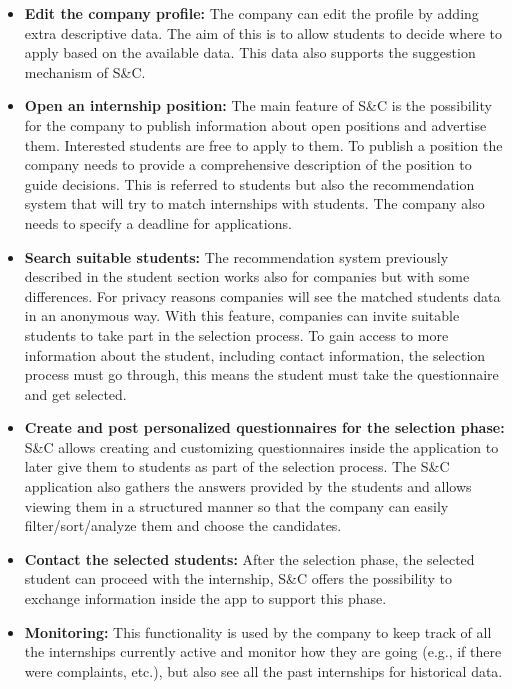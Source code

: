 \begin{itemize}
    \item \textbf{Edit the company profile:} The company can edit the profile by adding extra descriptive data. The aim of this is to allow students to decide where to apply based on the available data. This data also supports the suggestion mechanism of S\&C.
    
    \item \textbf{Open an internship position:} The main feature of S\&C is the possibility for the company to publish information about open positions and advertise them. Interested students are free to apply to them. To publish a position the company needs to provide a comprehensive description of the position to guide decisions. This is referred to students but also the recommendation system that will try to match internships with students. The company also needs to specify a deadline for applications.
    
    \item \textbf{Search suitable students:} The recommendation system previously described in the student section works also for companies but with some differences. For privacy reasons companies will see the matched students data in an anonymous way. With this feature, companies can invite suitable students to take part in the selection process. To gain access to more information about the student, including contact information, the selection process must go through, this means the student must take the questionnaire and get selected.
    
    \item \textbf{Create and post personalized questionnaires for the selection phase:} S\&C allows creating and customizing questionnaires inside the application to later give them to students as part of the selection process. The S\&C application also gathers the answers provided by the students and allows viewing them in a structured manner so that the company can easily filter/sort/analyze them and choose the candidates.
    
    \item \textbf{Contact the selected students:} After the selection phase, the selected student can proceed with the internship, S\&C offers the possibility to exchange information inside the app to support this phase.
    
    \item \textbf{Monitoring:} This functionality is used by the company to keep track of all the internships currently active and monitor how they are going (e.g., if there were complaints, etc.), but also see all the past internships for historical data.

\end{itemize}


